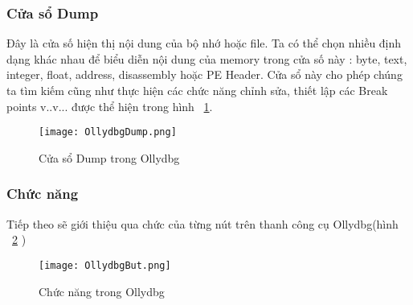 	\newpage	
	\subsubsection*{Cửa sổ Dump}
	Đây là cửa số hiện thị nội dung của bộ nhớ hoặc file. Ta có thể chọn nhiều định dạng khác nhau để biểu diễn nội dung của memory trong cửa số này : byte, text, integer, float, address, disassembly hoặc PE Header. Cửa sổ này cho phép chúng ta tìm kiếm cũng như  thực hiện các chức năng chỉnh sửa, thiết lập các Break points v..v... được thể hiện trong hình ~\ref{fig:OllydbgDump}.
	\begin{center}
			\begin{figure}[htp]
				\begin{center}
					\texttt{[image: OllydbgDump.png]}
				\end{center}
				\caption{Cửa sổ Dump trong Ollydbg}	
					\label{fig:OllydbgDump}		
			\end{figure}
		\end{center}		
	
	\newpage
	\subsubsection*{Chức năng}
	Tiếp theo sẽ giới thiệu qua chức của từng nút trên thanh công cụ Ollydbg(hình ~\ref{fig:OllydbgBut} )
		\begin{center}
			\begin{figure}[htp]
				\begin{center}
					\texttt{[image: OllydbgBut.png]}
				\end{center}
				\caption{Chức năng trong Ollydbg}	
					\label{fig:OllydbgBut}		
			\end{figure}
		\end{center}		
		
